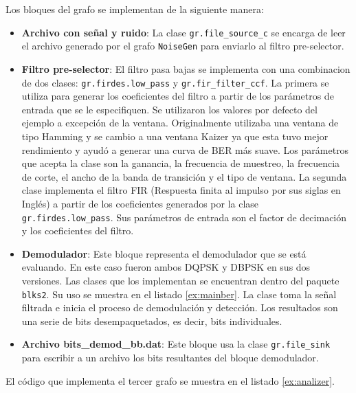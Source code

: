 Los bloques del grafo se implementan de la siguiente manera:

\begin{itemize}
  \item \textbf{Archivo con se\~nal y ruido}: La clase \verb|gr.file_source_c| se encarga de leer el
  archivo generado por el grafo \verb|NoiseGen| para enviarlo al filtro pre-selector.
  \item \textbf{Filtro pre-selector}: El filtro pasa bajas se implementa con una combinacion de dos
  clases: \verb|gr.firdes.low_pass| y \verb|gr.fir_filter_ccf|. La primera se utiliza para generar
  los coeficientes del filtro a partir de los par\'ametros de entrada que se le especifiquen. Se
  utilizaron los valores por defecto del ejemplo a excepci\'on de la ventana. Originalmente utilizaba
  una ventana de tipo Hamming y se cambio a una ventana Kaizer ya que esta tuvo mejor rendimiento y
  ayud\'o a generar una curva de BER m\'as suave. Los par\'ametros que acepta la clase son la
  ganancia, la frecuencia de muestreo, la frecuencia de corte, el ancho de la banda de transici\'on
  y el tipo de ventana. La segunda clase implementa el filtro FIR (Respuesta finita al impulso por sus siglas en Ingl\'es) a
  partir de los coeficientes generados por la clase \verb|gr.firdes.low_pass|. Sus par\'ametros de entrada son el factor de
  decimaci\'on y los coeficientes del filtro.
  \item \textbf{Demodulador}: Este bloque representa el demodulador que se est\'a evaluando. En este
  caso fueron ambos DQPSK y DBPSK en sus dos versiones. Las clases que los implementan se encuentran
  dentro del paquete \verb|blks2|. Su uso se muestra en el listado \ref{ex:mainber}. La clase toma
  la se\~nal filtrada e inicia el proceso de demodulaci\'on y detecci\'on. Los resultados son una serie de bits
  desempaquetados, es decir, bits individuales.
  \item \textbf{Archivo bits\_demod\_bb.dat}: Este bloque usa la clase \verb|gr.file_sink| para
  escribir a un archivo los bits resultantes del bloque demodulador.
\end{itemize}

El c\'odigo que implementa el tercer grafo se muestra en el listado \ref{ex:analizer}.

